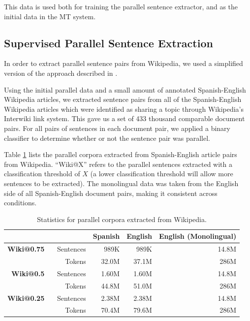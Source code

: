 This data is used both for training the parallel sentence extractor, and as the
initial data in the MT system.

\subsection{Supervised Parallel Sentence Extraction}
In order to extract parallel sentence pairs from Wikipedia, we used a simplified
version of the approach described in \citet{Smith10}.

Using the initial parallel data and a small amount of annotated Spanish-English
Wikipedia articles, we extracted sentence pairs from all of the Spanish-English
Wikipedia articles which were identified as sharing a topic through Wikipedia's
Interwiki link system. This gave us a set of 433 thousand comparable document
pairs. For all pairs of sentences in each document pair, we applied a binary
classifier to determine whether or not the sentence pair was parallel.

Table \ref{table:esen_wiki_parallel} lists the parallel corpora extracted from
Spanish-English article pairs from Wikipedia. ``Wiki@X'' refers to the parallel
sentences extracted with a classification threshold of $X$ (a lower
classification threshold will allow more sentences to be extracted). The
monolingual data was taken from the English side of all Spanish-English document
pairs, making it consistent across conditions.

\begin{table}[ht]
\begin{center}
\begin{tabular}{|rr||r|r|r|}
\hline
      &                & Spanish        & English & English (Monolingual) \\
\hline
\textbf{Wiki@0.75} \
      & Sentences     &   989K     & 989K & 14.8M     \\
      & Tokens     &  32.0M      & 37.1M & 286M    \\
\hline
\textbf{Wiki@0.5} \
      & Sentences     & 1.60M       & 1.60M & 14.8M     \\
      & Tokens     & 44.8M       & 51.0M & 286M     \\
\hline
\textbf{Wiki@0.25} \
      & Sentences     &   2.38M     & 2.38M & 14.8M     \\
      & Tokens     &  70.4M      & 79.6M & 286M    \\
\hline
\end{tabular}
\end{center}
\caption{Statistics for parallel corpora extracted from Wikipedia.}
\label{table:esen_wiki_parallel}
\end{table}

